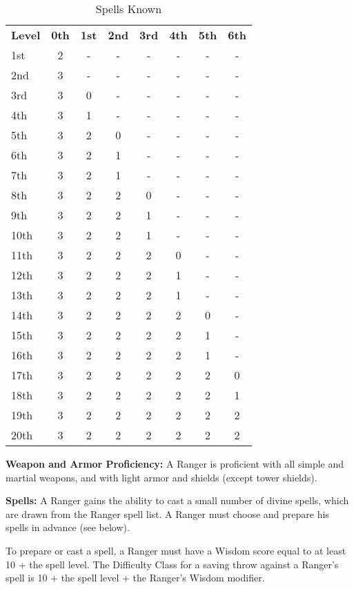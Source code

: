 \begin{wraptable}{O}{8.75cm}
\caption{\currentclassname{} Spells Known}
\begin{tabular}{l*{7}{c}}
\textbf{Level} & \textbf{0th} & \textbf{1st} & \textbf{2nd} & \textbf{3rd} & \textbf{4th} & \textbf{5th} & \textbf{6th} \\
1st & 2 & - & - & - & - & - & -\\
2nd & 3 & - & - & - & - & - & -\\
3rd & 3 & 0 & - & - & - & - & -\\
4th & 3 & 1 & - & - & - & - & -\\
5th & 3 & 2 & 0 & - & - & - & -\\
6th & 3 & 2 & 1 & - & - & - & -\\
7th & 3 & 2 & 1 & - & - & - & -\\
8th & 3 & 2 & 2 & 0 & - & - & -\\
9th & 3 & 2 & 2 & 1 & - & - & -\\
10th & 3 & 2 & 2 & 1 & - & - & -\\
11th & 3 & 2 & 2 & 2 & 0 & - & -\\
12th & 3 & 2 & 2 & 2 & 1 & - & -\\
13th & 3 & 2 & 2 & 2 & 1 & - & -\\
14th & 3 & 2 & 2 & 2 & 2 & 0 & -\\
15th & 3 & 2 & 2 & 2 & 2 & 1 & -\\
16th & 3 & 2 & 2 & 2 & 2 & 1 & -\\
17th & 3 & 2 & 2 & 2 & 2 & 2 & 0\\
18th & 3 & 2 & 2 & 2 & 2 & 2 & 1\\
19th & 3 & 2 & 2 & 2 & 2 & 2 & 2\\
20th & 3 & 2 & 2 & 2 & 2 & 2 & 2\\
\end{tabular}
\end{wraptable}

\classfeatures

\textbf{Weapon and Armor Proficiency:} A Ranger is proficient with all simple and martial weapons, and with light armor and shields (except tower shields).

\textbf{Spells:} A Ranger gains the ability to cast a small number of divine spells, which are drawn from the Ranger spell list. A Ranger must choose and prepare his spells in advance (see below).

To prepare or cast a spell, a Ranger must have a Wisdom score equal to at least 10 + the spell level. The Difficulty Class for a saving throw against a Ranger's spell is 10 + the spell level + the Ranger's Wisdom modifier.

